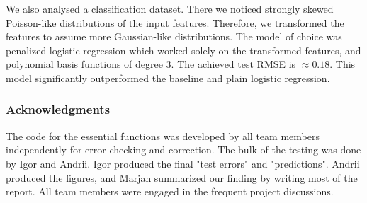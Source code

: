 \documentclass{article} %
\begin{document}
We also analysed a classification dataset. There we noticed strongly skewed Poisson-like distributions of the input features. Therefore, we transformed the features to assume more Gaussian-like distributions. The model of choice was penalized logistic regression which worked solely on the transformed features, and polynomial basis functions of degree 3. The achieved test RMSE is $\approx0.18$. This model significantly outperformed the baseline and plain logistic regression.


\subsubsection*{Acknowledgments}

The code for the essential functions was developed by all team members independently for error checking and correction. The bulk of the testing was done by Igor and Andrii. Igor produced the final "test errors" and "predictions". Andrii produced the figures, and Marjan summarized our finding by writing most of the report. All team members were engaged in the frequent project discussions.


\end{document}
